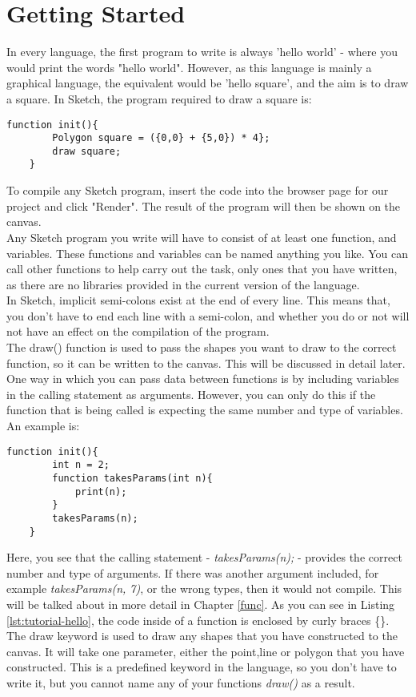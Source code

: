 \documentclass{l3proj}
\begin{document}
\section{Getting Started}
\label{start}
In every language, the first program to write is always 'hello world' - where you would print the words "hello world". However, as this language is mainly a graphical language, the equivalent would be 'hello square', and the aim is to draw a square. In Sketch, the program required to draw a square is:\\
\lstset{%
      basicstyle=\ttfamily\footnotesize\bfseries,
      xleftmargin=.1\textwidth, xrightmargin=.1\textwidth,
      captionpos=b,
      tabsize=4
    }
\begin{lstlisting}[caption={Hello Square},label={lst:tutorial-hello}]
    function init(){
        Polygon square = ({0,0} + {5,0}) * 4};
        draw square;
    }
\end{lstlisting}
To compile any Sketch program, insert the code into the browser page for our project and click "Render". The result of the program will then be shown on the canvas.
\\ [12pt]
Any Sketch program you write will have to consist of at least one function, and variables. These functions and variables can be named anything you like. You can call other functions to help carry out the task, only ones that you have written, as there are no libraries provided in the current version of the language. 
\\ [12pt]
In Sketch, implicit semi-colons exist at the end of every line. This means that, you don't have to end each line with a semi-colon, and whether you do or not will not have an effect on the compilation of the program. 
\\ [12pt]
The draw() function is used to pass the shapes you want to draw to the correct function, so it can be written to the canvas. This will be discussed in detail later.
\\ [12pt]
One way in which you can pass data between functions is by including variables in the calling statement as arguments. However, you can only do this if the function that is being called is expecting the same number and type of variables. An example is:
\begin{lstlisting}[caption={Function Parameters},label={lst:tutorial-parameters}]
    function init(){
        int n = 2;
        function takesParams(int n){
            print(n);
        }
        takesParams(n);
    }
\end{lstlisting}
Here, you see that the calling statement - \textit{takesParams(n);} - provides the correct number and type of arguments. If there was another argument included, for example \textit{takesParams(n, 7)}, or the wrong types, then it would not compile. This will be talked about in more detail in Chapter \ref{func}. As you can see in Listing \ref{lst:tutorial-hello}, the code inside of a function is enclosed by curly braces \{\}. The draw keyword is used to draw any shapes that you have constructed to the canvas. It will take one parameter, either the point,line or polygon that you have constructed. This is a predefined keyword in the language, so you don't have to write it, but you cannot name any of your functions \textit{draw()} as a result. 
\end{document}
